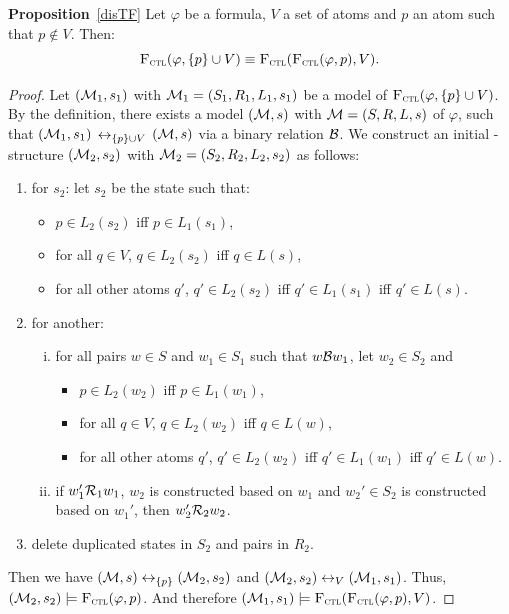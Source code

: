 \documentclass{article}
\begin{document}
\textbf{Proposition}~\ref{disTF} Let $\varphi$ be a formula, $V$ a set of atoms and $p$ an atom such that $p \notin V$. Then:
\[
{\textsc{F}_{\textsc{ctl}}}(\varphi, \{p\} \cup V) \equiv {\textsc{F}_{\textsc{ctl}}}({\textsc{F}_{\textsc{ctl}}}(\varphi, p), V).
\]
\begin{proof}
Let $({\cal M}_1, s_1) $ with ${\cal M}_1=(S_1, R_1, L_1,s_1)$ be a model of ${\textsc{F}_{\textsc{ctl}}}(\varphi, \{p\} \cup V)$. By the definition, there exists a model $({\cal M},s)$ with ${\cal M} = (S, R,L,s)$ of $\varphi$, such that $({\cal M}_1, s_1)$ $\leftrightarrow_{\{p\} \cup V}$ $({\cal M}, s)$ via a binary relation ${\cal B}$. We construct an initial \MPK-structure $({\cal M}_2, s_2)$ with ${\cal M}_2 = (S_2, R_2, L_2,s_2)$ as follows:
\begin{enumerate}[(1)]
  \item for $s_2$: let $s_2$ be the state such that:
  \begin{itemize}
    \item $p \in L_2(s_2)$ iff $p \in L_1(s_1)$,
    \item for all $q \in V$, $q \in L_2(s_2)$ iff $q\in L(s)$,
    \item for all other atoms $q'$, $q' \in L_2(s_2)$ iff $q' \in L_1(s_1)$ iff $q'\in L(s)$.
  \end{itemize}
  \item for another:
  \begin{enumerate}[(i)]
    \item for all pairs  $w \in S$ and $w_1 \in S_1$ such that $w {\cal B} w_1$, let $w_2 \in S_2$ and
        \begin{itemize}
          \item $p \in L_2(w_2)$ iff $p \in L_1(w_1)$,
          \item for all $q \in V$, $q \in L_2(w_2)$ iff $q\in L(w)$,
          \item for all other atoms $q'$, $q' \in L_2(w_2)$ iff $q' \in L_1(w_1)$ iff $q'\in L(w)$.
        \end{itemize}
    \item if $w_1' {\cal R}_1 w_1$, $w_2$ is constructed based on $w_1$ and $w_2'\in S_2$ is constructed based on $w_1'$, then $w_2' {\cal R}_2 w_2$.
  \end{enumerate}
  \item delete duplicated states in $S_2$ and pairs in $R_2$.
\end{enumerate}
Then we have $({\cal M}, s) \leftrightarrow_{\{p\}} ({\cal M}_2, s_2)$ and $({\cal M}_2, s_2) \leftrightarrow_V ({\cal M}_1, s_1)$. Thus, $({\cal M}_2, s_2) \models {\textsc{F}_{\textsc{ctl}}}(\varphi, p)$. And therefore $({\cal M}_1, s_1) \models {\textsc{F}_{\textsc{ctl}}}({\textsc{F}_{\textsc{ctl}}}(\varphi, p), V)$.


\end{proof}
\end{document}
